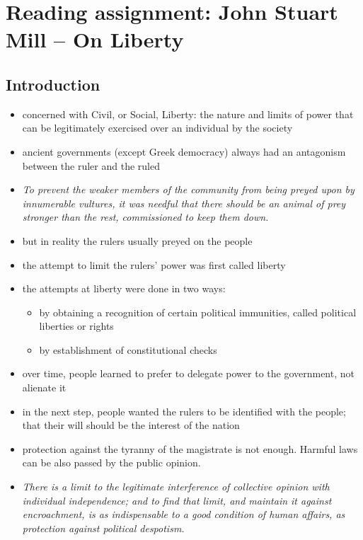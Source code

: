 \section{Reading assignment: John Stuart Mill -- On Liberty}

\subsection{Introduction}

\begin{itemize}
	\item concerned with Civil, or Social, Liberty: the nature and limits
	of power that can be legitimately exercised over an individual by the
	society
	\item ancient governments (except Greek democracy) always had an
	antagonism between the ruler and the ruled
	\item \textit{To prevent the weaker members of the community
	from being preyed upon by innumerable vultures, it
	was needful that there should be an animal of prey
	stronger than the rest, commissioned to keep them
	down.}
	\item but in reality the rulers usually preyed on the people
	\item the attempt to limit the rulers' power was first called liberty
	\item the attempts at liberty were done in two ways:
	\begin{itemize}
		\item by obtaining a recognition of certain political
		immunities, called political liberties or rights
		\item by establishment of constitutional checks
	\end{itemize}
	\item over time, people learned to prefer to delegate power to the
	government, not alienate it
	\item in the next step, people wanted the rulers to be identified with
	the people; that their will should be the interest of the nation
	\item protection against the tyranny of the magistrate is not enough.
	Harmful laws can be also passed by the public opinion.
	\item \textit{There is a limit to the legitimate
	interference of collective opinion with individual independence; and
	to find that limit, and maintain it against encroachment, is as
	indispensable to a good condition of human affairs, as protection
	against political despotism.}
\end{itemize}

